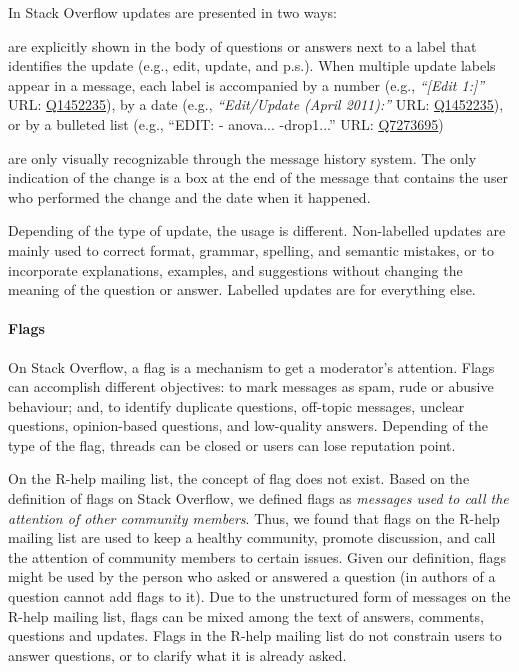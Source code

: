 	In Stack Overflow updates are presented in two ways:
	\begin{description}[itemsep=3pt, topsep=2pt, leftmargin=3em, parsep=0pt]
		\item[Labelled updates] are explicitly shown in the body of questions or answers next to a label that identifies the update (e.g., edit, update, and p.s.).
		When multiple update labels appear in a message, each label is accompanied by a number (e.g., \textit{``[Edit 1:]''} {\footnotesize URL:  \href{http://goo.gl/ptYAG0}{Q1452235}}), by a date (e.g., \textit{``Edit/Update (April 2011):''} {\footnotesize URL:  \href{http://goo.gl/ptYAG0}{Q1452235}}), or by a bulleted list (e.g., ``EDIT: - anova... -drop1...'' {\footnotesize URL:  \href{http://goo.gl/sQiq0M}{Q7273695}})

		\item[Non-labelled updates] are only visually recognizable through the message history system. The only indication of the change is a box at the end of the message that contains the user who performed the change and the date when it happened.
	\end{description}

	Depending of the type of update, the usage is different.
	Non-labelled updates are mainly used to correct format, grammar, spelling, and semantic mistakes, or to incorporate explanations, examples, and suggestions without changing the meaning of the question or answer. Labelled updates are for everything else.


\paragraph*{Flags}

	On Stack Overflow, a flag is a mechanism to get a moderator's attention.
	Flags can accomplish different objectives: to mark messages as spam, rude or abusive behaviour; and, to identify duplicate questions, off-topic messages, unclear questions, opinion-based questions, and low-quality answers.
	Depending of the type of the flag, threads can be closed or users can lose reputation point.
    
    On the R-help mailing list, the concept of flag does not exist. 
    Based on the definition of flags on Stack Overflow, we defined flags as \emph{messages used to call the attention of other community members}.
    Thus, we found that flags on the R-help mailing list are used to keep a healthy community, promote discussion, and call the attention of community members to certain issues.
    Given our definition, flags might be used by the person who asked or answered a question (in \SO authors of a question cannot add flags to it).
    Due to the unstructured form of messages on the R-help mailing list, flags can be mixed among the text of answers, comments, questions and updates.
	Flags in the R-help mailing list do not constrain users to answer questions, or to clarify what it is already asked.

